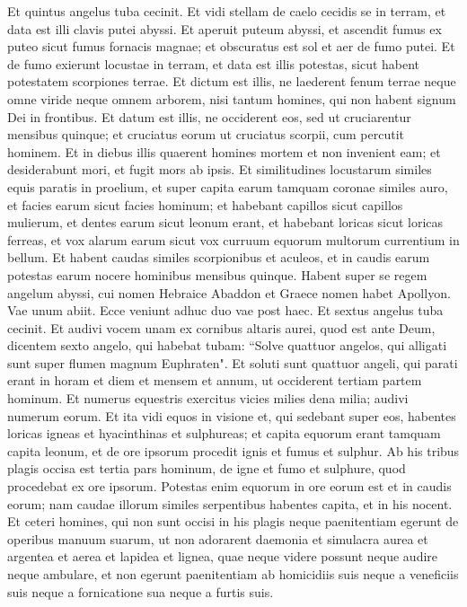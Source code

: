 \begin{biblechapter}  
\verse Et quintus angelus tuba cecinit. Et vidi stellam de caelo cecidis se in terram, et data est illi clavis putei abyssi. 
\verse Et aperuit puteum abyssi, et ascendit fumus ex puteo sicut fumus fornacis magnae; et obscuratus est sol et aer de fumo putei. 
\verse Et de fumo exierunt locustae in terram, et data est illis potestas, sicut habent potestatem scorpiones terrae. 
\verse Et dictum est illis, ne laederent fenum terrae neque omne viride neque omnem arborem, nisi tantum homines, qui non habent signum Dei in frontibus. 
\verse Et datum est illis, ne occiderent eos, sed ut cruciarentur mensibus quinque; et cruciatus eorum ut cruciatus scorpii, cum percutit hominem. 
\verse Et in diebus illis quaerent homines mortem et non invenient eam; et desiderabunt mori, et fugit mors ab ipsis. 
\verse Et similitudines locustarum similes equis paratis in proelium, et super capita earum tamquam coronae similes auro, et facies earum sicut facies hominum; 
\verse et habebant capillos sicut capillos mulierum, et dentes earum sicut leonum erant, 
\verse et habebant loricas sicut loricas ferreas, et vox alarum earum sicut vox curruum equorum multorum currentium in bellum. 
\verse Et habent caudas similes scorpionibus et aculeos, et in caudis earum potestas earum nocere hominibus mensibus quinque. 
\verse Habent super se regem angelum abyssi, cui nomen Hebraice Abaddon et Graece nomen habet Apollyon. 
\verse Vae unum abiit. Ecce veniunt adhuc duo vae post haec. 
\verse Et sextus angelus tuba cecinit. Et audivi vocem unam ex cornibus altaris aurei, quod est ante Deum, 
\verse dicentem sexto angelo, qui habebat tubam: “Solve quattuor angelos, qui alligati sunt super flumen magnum Euphraten".  
\verse Et soluti sunt quattuor angeli, qui parati erant in horam et diem et mensem et annum, ut occiderent tertiam partem hominum. 
\verse Et numerus equestris exercitus vicies milies dena milia; audivi numerum eorum. 
\verse Et ita vidi equos in visione et, qui sedebant super eos, habentes loricas igneas et hyacinthinas et sulphureas; et capita equorum erant tamquam capita leonum, et de ore ipsorum procedit ignis et fumus et sulphur. 
\verse Ab his tribus plagis occisa est tertia pars hominum, de igne et fumo et sulphure, quod procedebat ex ore ipsorum. 
\verse Potestas enim equorum in ore eorum est et in caudis eorum; nam caudae illorum similes serpentibus habentes capita, et in his nocent. 
\verse Et ceteri homines, qui non sunt occisi in his plagis neque paenitentiam egerunt de operibus manuum suarum, ut non adorarent daemonia et simulacra aurea et argentea et aerea et lapidea et lignea, quae neque videre possunt neque audire neque ambulare, 
\verse et non egerunt paenitentiam ab homicidiis suis neque a veneficiis suis neque a fornicatione sua neque a furtis suis. 
\end{biblechapter}


